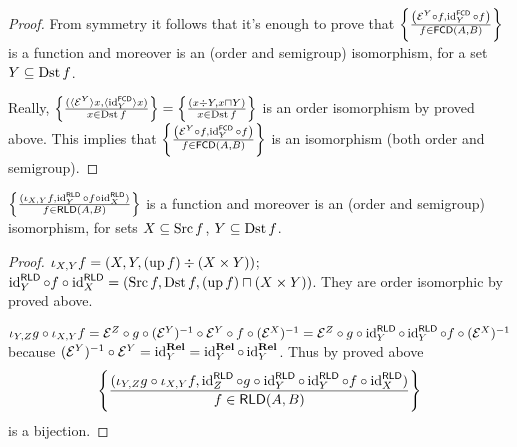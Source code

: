 \begin{proof}
  From symmetry it follows that it's enough to prove that $\left\{ \frac{ \left(
  \mathcal{E}^Y \circ f , \operatorname{id}^{\mathsf{FCD}}_Y \circ f \right)
  }{ f \in \mathsf{FCD} (A , B) }\right\}$ is a
  function and moreover is an (order and semigroup) isomorphism, for a set $Y
  \subseteq \operatorname{Dst} f$.
  
  Really, $\left\{ \frac{ (\langle \mathcal{E}^Y \rangle x , \langle
  \operatorname{id}^{\mathsf{FCD}}_Y \rangle x) }{ x
  \in \operatorname{Dst} f }\right\} = \left\{ \frac{ (x \div Y , x \sqcap Y) }{
  x \in \operatorname{Dst} f }\right\}$ is an order isomorphism by proved
  above. This implies that $\left\{ \frac{ \left( \mathcal{E}^Y \circ f ,
  \operatorname{id}^{\mathsf{FCD}}_Y \circ f \right) }{
  f \in \mathsf{FCD} (A , B) }\right\}$ is an isomorphism
  (both order and semigroup).
\end{proof}

\begin{prop}
  $\left\{ \frac{ (\iota_{X, Y} f , \operatorname{id}^{\mathsf{RLD}}_Y \circ f \circ
  \operatorname{id}^{\mathsf{RLD}}_X) }{ f \in
  \mathsf{RLD} (A , B) }\right\}$ is a function and moreover is an
  (order and semigroup) isomorphism, for sets $X \subseteq \operatorname{Src} f$, $Y
  \subseteq \operatorname{Dst} f$.
\end{prop}

\begin{proof}
  $\iota_{X, Y} f = (X , Y , (\operatorname{up} f) \div (X \times Y))$;
  $\operatorname{id}^{\mathsf{RLD}}_Y \circ f \circ
  \operatorname{id}^{\mathsf{RLD}}_X = (\operatorname{Src} f , \operatorname{Dst} f ,
  (\operatorname{up} f) \sqcap (X \times Y))$. They are order isomorphic by proved
  above.
  
  $\iota_{Y, Z} g \circ \iota_{X, Y} f =\mathcal{E}^Z \circ g \circ
  (\mathcal{E}^Y)^{- 1} \circ \mathcal{E}^Y \circ f \circ (\mathcal{E}^X)^{-
  1} =\mathcal{E}^Z \circ g \circ \operatorname{id}^{\mathsf{RLD}}_Y \circ
  \operatorname{id}^{\mathsf{RLD}}_Y \circ f \circ (\mathcal{E}^X)^{- 1}$
  because $(\mathcal{E}^Y)^{- 1} \circ \mathcal{E}^Y =
  \operatorname{id}^{\mathbf{Rel}}_Y = \operatorname{id}^{\mathbf{Rel}}_Y
  \circ \operatorname{id}^{\mathbf{Rel}}_Y$. Thus by proved above
  \[ \left\{ \frac{ (\iota_{Y, Z} g \circ \iota_{X, Y} f ,
     \operatorname{id}^{\mathsf{RLD}}_Z \circ g \circ
     \operatorname{id}^{\mathsf{RLD}}_Y \circ \operatorname{id}^{\mathsf{RLD}}_Y
     \circ f \circ \operatorname{id}^{\mathsf{RLD}}_X) }{
     f \in \mathsf{RLD} (A , B) }\right\} \]
  is a bijection.
\end{proof}


